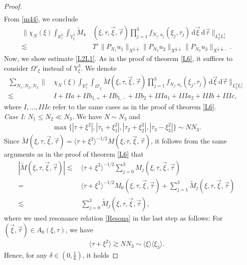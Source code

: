 \documentclass[reqno]{amsart}
\theoremstyle{Definitionl}
\theoremstyle{Definitionk}
\theoremstyle{definition}
\theoremstyle{Satzk}
\theoremstyle{Satzl}
\theoremstyle{Bemerkung}
\begin{document}
\begin{proof}
\begin{align*}
\end{align*}
From \eqref{m44}, we conclude
\begin{align}
\Big\|\chi_N(\xi)\int_{\mathbb R^3_\tau}\int_{\mathbb Y^3_\xi}\tilde M_4&\,(\xi,\tau,\vec\xi,\vec\tau)\prod_{j=1}^3f_{N_j,u_j}(\xi_j,\tau_j)\,\mathrm d\vec\xi\,\mathrm d\vec\tau\Big\|_{L^2_{\xi}L^1_\tau}\nonumber\\
\lesssim&\, T^\varepsilon \|P_{N_1}u_1\|_{X^{\frac12,\frac12}}\|P_{N_2}u_2\|_{X^{\frac12,\frac12}}\|P_{N_3}u_3\Big\|_{X^{\frac12,\frac12,-}}.\label{tN}
\end{align}
Now, we show estimate \eqref{L2L1}. As in the proof of theorem \ref{L6}, it suffices to consider $\Omega'_\xi$ instead of $\mathbb Y^3_\xi$. We denote
\begin{align*}
\sum_{N_1,N_2,N_3}\Big\|&\,\chi_N(\xi)\int_{\mathbb R^3_\tau}\int_{\Omega'_\xi}\tilde M(\xi,\tau,\vec\xi,\vec\tau)\prod_{j=1}^3f_{N_j,u_j}(\xi_j,\tau_j)\,\mathrm d\vec\xi\,\mathrm d\vec\tau\Big\|_{L^2_\xi L^1_\tau}\\
\lesssim&\, I+IIa+II{b_{1,+}}+II{b_{1,-}}+IIb_2+IIIa_1+IIIa_2+IIIb+IIIc,
\end{align*}
where $I,...,IIIc$ refer to the same cases as in the proof of theorem \ref{L6}.\\[10pt]
\emph{Case I: $N_1\le N_2\ll N_3$. }We have $N\sim N_3$ and 
\begin{align*}
\max\{|\tau+\xi^2|,|\tau_1+\xi_1^2|,|\tau_2+\xi_2^2|,|\tau_3-\xi_3^2|\}\sim NN_3.
\end{align*}
Since $\tilde M(\xi,\tau,\vec\xi,\vec\tau)=\langle\tau+\xi^2\rangle^{-1/2}M(\xi,\tau,\vec\xi,\vec\tau)$, it follows from the same arguments as in the proof of theorem \ref{L6} that
\begin{align}
|\tilde M(\xi,\tau,\vec\xi,\vec\tau)|
\lesssim&\, \langle\tau+\xi^2\rangle^{-1/2}\sum_{j=0}^3M_j(\xi,\tau,\vec\xi,\vec\tau)\nonumber\\
=&\, \langle\tau+\xi^2\rangle^{-1/2}M_0(\xi,\tau,\vec\xi,\vec\tau)+\sum_{j=1}^3\tilde M_j(\xi,\tau,\vec\xi,\vec\tau)\nonumber\\
\lesssim&\, \sum_{j=0}^3\tilde M_j(\xi,\tau,\vec\xi,\vec\tau),\label{tmop}
\end{align}
where we used resonance relation \eqref{Resona} in the last step as follows: For $(\vec\xi,\vec\tau)\in A_0(\xi,\tau)$, we have 
\begin{align*}
\langle\tau+\xi^2\rangle\gtrsim NN_3\sim\langle\xi\rangle\langle\xi_3\rangle.
\end{align*}
Hence, for any $\delta\in(0,\tfrac16)$, it holds

\end{proof}
\end{document}
